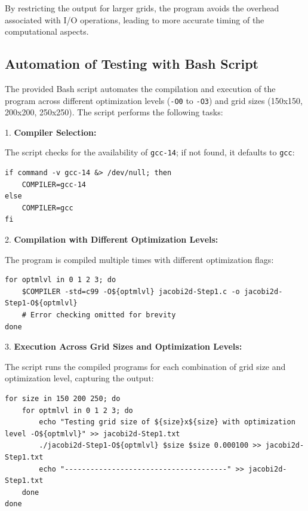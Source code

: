 \documentclass{article}
\begin{document}
By restricting the output for larger grids, the program avoids the overhead associated with I/O operations, leading to more accurate timing of the computational aspects.

\subsection{Automation of Testing with Bash Script}

The provided Bash script automates the compilation and execution of the program across different optimization levels (\texttt{-O0} to \texttt{-O3}) and grid sizes (150x150, 200x200, 250x250). The script performs the following tasks:

1. \textbf{Compiler Selection:}

   The script checks for the availability of \texttt{gcc-14}; if not found, it defaults to \texttt{gcc}:

\begin{lstlisting}[style=BashStyle, caption={Compiler Selection}]
if command -v gcc-14 &> /dev/null; then
    COMPILER=gcc-14
else
    COMPILER=gcc
fi
\end{lstlisting}

2. \textbf{Compilation with Different Optimization Levels:}

   The program is compiled multiple times with different optimization flags:

\begin{lstlisting}[style=BashStyle, caption={Compilation with Different Optimization Levels}]
for optmlvl in 0 1 2 3; do
    $COMPILER -std=c99 -O${optmlvl} jacobi2d-Step1.c -o jacobi2d-Step1-O${optmlvl}
    # Error checking omitted for brevity
done
\end{lstlisting}

3. \textbf{Execution Across Grid Sizes and Optimization Levels:}

   The script runs the compiled programs for each combination of grid size and optimization level, capturing the output:

\begin{lstlisting}[style=BashStyle, caption={Automated Testing Loop for Grid Sizes and Optimization Levels}]
for size in 150 200 250; do
    for optmlvl in 0 1 2 3; do
        echo "Testing grid size of ${size}x${size} with optimization level -O${optmlvl}" >> jacobi2d-Step1.txt
        ./jacobi2d-Step1-O${optmlvl} $size $size 0.000100 >> jacobi2d-Step1.txt
        echo "--------------------------------------" >> jacobi2d-Step1.txt
    done
done
\end{lstlisting}
\end{document}
